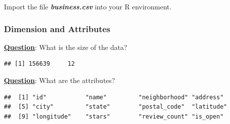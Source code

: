 \documentclass[12pt]{book}\usepackage{knitr}
\begin{document}
\noindent Import the file \emph{\textbf{business.csv}} into your R environment. 


\subsubsection{Dimension and Attributes}
\noindent \textbf{\underline{Question}}: What is the size of the data?
\begin{knitrout}
\color{fgcolor}\begin{kframe}
\begin{alltt}
\end{alltt}
\begin{verbatim}
## [1] 156639     12
\end{verbatim}
\begin{alltt}
\end{alltt}
\end{kframe}
\end{knitrout}

\noindent \textbf{\underline{Question}}: What are the attributes?
\begin{knitrout}
\color{fgcolor}\begin{kframe}
\begin{alltt}
\end{alltt}
\begin{verbatim}
##  [1] "id"           "name"         "neighborhood" "address"     
##  [5] "city"         "state"        "postal_code"  "latitude"    
##  [9] "longitude"    "stars"        "review_count" "is_open"
\end{verbatim}
\begin{alltt}
\end{alltt}
\end{kframe}
\end{knitrout}

\newpage
\end{document}
